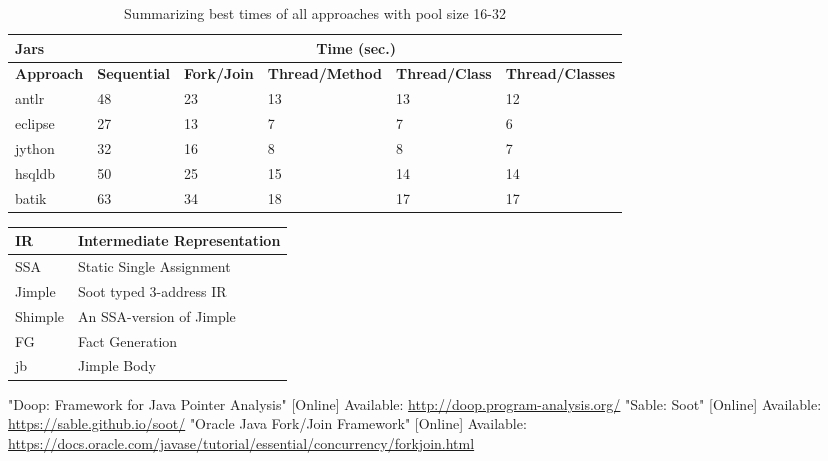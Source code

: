 \documentclass{dithesis}
\begin{document}
\begin{table}[H]
\centering
\label{my-label}
\begin{tabular}{@{}l|lllll@{}}
\toprule
\textbf{Jars}     & \multicolumn{5}{c}{\textbf{Time (sec.)}}                                                                           \\ \midrule
\textbf{Approach} & \textbf{Sequential} & \textbf{Fork/Join} & \textbf{Thread/Method} & \textbf{Thread/Class} & \textbf{Thread/Classes} \\ \midrule
antlr             & 48                  & 23                 & 13                     & 13                    & 12                      \\
eclipse           & 27                  & 13                 & 7                      & 7                     & 6                       \\
jython            & 32                  & 16                 & 8                      & 8                     & 7                       \\
hsqldb            & 50                  & 25                 & 15                     & 14                    & 14                      \\
batik             & 63                  & 34                 & 18                     & 17                    & 17                      \\ \bottomrule
\end{tabular}
\caption{Summarizing best times of all approaches with pool size 16-32}
\end{table}






\begin{thesisabbreviations}
	\begin{tabularx}{\textwidth}{|X|X|}
        \hline
        IR & Intermediate Representation \\
        \hline
        SSA & Static Single Assignment \\
        \hline
        Jimple & Soot typed 3-address IR \\
        \hline
        Shimple & An SSA-version of Jimple \\
        \hline
        FG & Fact Generation \\
        \hline
        jb & Jimple Body \\
		\hline
	\end{tabularx}
\end{thesisabbreviations}


\begin{thesisbibliography}[REFERENCES]{99}
		"Doop: Framework for Java Pointer Analysis"
		[Online]
		Available: \url{http://doop.program-analysis.org/}
		"Sable: Soot"
		[Online]
		Available: \url{https://sable.github.io/soot/}
		"Oracle Java Fork/Join Framework"
		[Online]
		Available: \url{https://docs.oracle.com/javase/tutorial/essential/concurrency/forkjoin.html}
\end{thesisbibliography}
\end{document}
